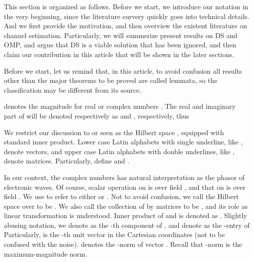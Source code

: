 \startchapter [title={Introduction}]


This section is organized as follows.
Before we start, we introduce our notation in the very beginning, since the literature survery quickly goes into technical details.
And we first provide the motivation, and then overview the existent literature on channel estimation.
Particularly, we will summerize present results on DS and OMP, and argue that DS is a viable solution that has been ignored, and then claim our contribution in this article that will be shown in the later sections.

\startsection [title={Notation}]

Before we start, let us remind that, in this article, to avoid confusion all results other than the major theorems to be proved are called lemmata, so the classification may be different from its source.

 denotes the magnitude for real or complex numbers .
The real and imaginary part of  will be denoted respectively as  and , respectively, thus 

We restrict our discussion to  or  seen as the Hilbert space , equipped with standard inner product.
Lower case Latin alphabets with single underline, like , denote vectors, and upper case Latin alphabets with double underlines, like , denote matrices.
Particularly, define  and .

In our context, the complex numbers has natural interpretation as the phasor of electronic waves.
Of course, scalar operation on  is over field , and that on  is over field .
We use  to refer to either  or .
Not to avoid confusion, we call the Hilbert space  over  to be .
We also call the collection of  by  matrices to be , and its role as linear transformation is understood.
Inner product of  and  is denoted as .
Slightly abusing notation, we denote as  the -th component of , and denote as  the -entry of 
Particularly,  is the -th unit vector in the Cartesian coordinates (not to be confused with the noise).
 denotes the -norm of vector .
Recall that \m{\ell_\infty}-norm is the maximum-magnitude norm.

